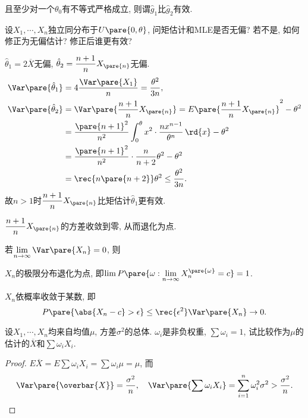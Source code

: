 \documentclass[../Statistics.tex]{subfiles}
\begin{document}
且至少对一个$\theta_0$有不等式严格成立, 则谓$\hat{g}_1$比$\hat{g}_2$有效.
\begin{sample}
    \begin{ex}
        设$X_1,\cdots,X_n$独立同分布于$U\pare{0,\theta}$, 问矩估计和MLE是否无偏? 若不是, 如何修正为无偏估计? 修正后谁更有效?
    \end{ex}
    \begin{solution}
        $\hat{\theta}_1 = 2\overbar{X}$无偏, $\hat{\theta}_2 = \displaystyle \frac{n+1}{n}X_{\pare{n}}$无偏.
        \begin{align*}
            \Var\pare{\hat{\theta}_1} &= 4 \frac{\Var\pare{X_1}}{n} = \frac{\theta^2}{3n}, \\
            \Var\pare{\hat{\theta}_2} &= \Var\pare{\frac{n+1}{n}X_{\pare{n}}} = E\pare{\frac{n+1}{n}X_{\pare{n}}}^2 - \theta^2 \\
            &= \frac{\pare{n+1}^2}{n^2}\int_0^\theta x^2\cdot \frac{nx^{n-1}}{\theta^n}\,\rd{x} - \theta^2 \\
            &= \frac{\pare{n+1}^2}{n^2} \cdot \frac{n}{n+2}\theta^2 - \theta^2 \\
            &= \rec{n\pare{n+2}}\theta^2 \le \frac{\theta^2}{3n}.
        \end{align*}
        故$n>1$时$\displaystyle \frac{n+1}{n}X_{\pare{n}}$比矩估计$\hat{\theta}_1$更有效.
    \end{solution}
    \begin{remark}
        $\displaystyle \frac{n+1}{n}X_{\pare{n}}$的方差收敛到零, 从而退化为点.
    \end{remark}
\end{sample}
\begin{proposition}
    若$\displaystyle \lim_{n\rightarrow\infty} \Var\pare{X_n} = 0$, 则
    \begin{cenum}
        \item $X_n$的极限分布退化为点, 即$\displaystyle \lim P\pare{\omega: \lim_{n\rightarrow\infty} X_n^{\pare{\omega}}=c}=1$.
        \item $X_n$依概率收敛于某数, 即
        \[ P\pare{\abs{X_n - c}>\epsilon} \le \rec{\epsilon^2}\Var\pare{X_n}\rightarrow 0. \]
    \end{cenum}
\end{proposition}
\begin{sample}
    \begin{ex}
        设$X_1,\cdots,X_n$均来自均值$\mu$, 方差$\sigma^2$的总体. $\omega_i$是非负权重, $\sum \omega_i = 1$, 试比较作为$\mu$的估计的$\overbar{X}$和$\sum \omega_iX_i$.
    \end{ex}
    \begin{proof}
        $E\overbar{X} = E\sum \omega_i X_i = \sum \omega_i \mu = \mu$, 而
        \[ \Var\pare{\overbar{X}} = \frac{\sigma^2}{n},\quad \Var\pare{\sum \omega_i X_i} = \sum_{i=1}^n \omega_i^2 \sigma^2 > \frac{\sigma^2}{n}. \qedhere \]
    \end{proof}
\end{sample}
\end{document}
